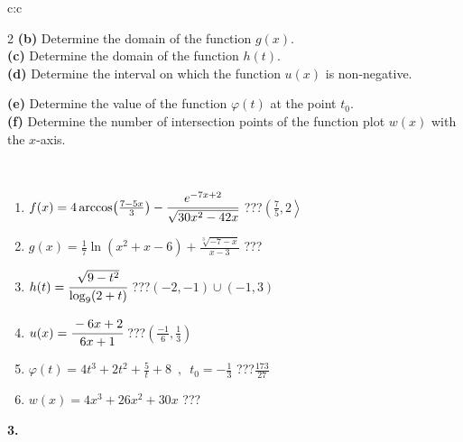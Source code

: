 \documentclass[10pt]{report}
\begin{document}
\begin{tabular}{c:c}
\begin{minipage}[c][104.5mm][t]{0.5\linewidth}
\begin{center}
\begin{minipage}{0.95\linewidth}
\begin{center}
{\begin{multicols}{2}
\textbf{(b)} Determine the domain of the function \(g(x)\). \\[1mm]
\textbf{(c)} Determine the domain of the function \(h(t)\). \\[1mm]
\textbf{(d)} Determine the interval on which the function \(u(x)\) is non-negative. \par \columnbreak
\textbf{(e)} Determine the value of the function \(\varphi(t)\) at the point \(t_0\). \\[1mm]
\textbf{(f)} Determine the number of intersection points of the function plot \(w(x)\) with the \(x\)-axis. \\[1mm]
\end{multicols}
}
\end{center}
\end{minipage}
\\[4mm]
\begin{minipage}{0.79\linewidth}
\begin{center}
\begin{varwidth}{\linewidth}
\begin{enumerate}
\small
\item $f(x) = 4\arccos\!\left( \frac{7-5x}{3} \right) - \cfrac{e^{-7x+2}}{\sqrt{30x^2-42x}}$\quad \dotfill\; ???\;\dotfill \quad $\left(\frac{7}{5} , 2\right\rangle$
\item $g(x) = \frac{1}{7} \ln{\!(x^2+x-6)}+\frac{\sqrt[3]{-7-x}}{x-3}$\quad \dotfill\; ???\;\dotfill {}
\item $h(t) = \cfrac{\sqrt{9-t^2}}{\log_9(2+t)}$\quad \dotfill\; ???\;\dotfill \quad $\left(-2 , -1\right)\cup\left(-1 , 3\right)$
\item $u(x) = \cfrac{-6x+2}{6x+1}$\quad \dotfill\; ???\;\dotfill \quad $\left(\frac{-1}{6} , \frac{1}{3}\right)$
\item $\varphi(t) = 4t^3+2t^2+\frac{5}{t}+8 \enspace , \enspace t_0=-\frac{1}{3}$\quad \dotfill\; ???\;\dotfill \quad $\frac{173}{27}$
\item $w(x) = 4x^3+26x^2+30x$\quad \dotfill\; ???\;\dotfill {}
\end{enumerate}
\end{varwidth}
\end{center}
\end{minipage}
\begin{minipage}{0.20\linewidth}
\begin{center}
{\Huge\bfseries 3.} \\[2mm]

\end{center}
\end{minipage}
\end{center}
\end{minipage}
\end{tabular}
\end{document}
